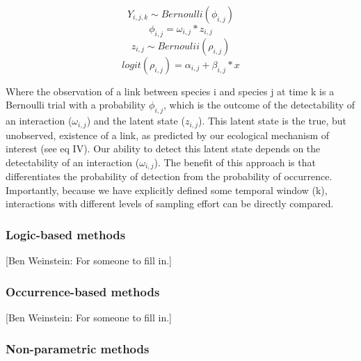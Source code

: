 \[ Y_{i,j,k} \sim Bernoulli(\phi_{i,j})\] \[ \phi_{i,j} = \omega_{i,j} *
z_{i,j}\] \[z_{i,j} \sim Bernoulii(\rho_{i,j})\] \[ logit(\rho_{i,j}) =
\alpha_{i,j} + \beta_{i,j} * x \]

Where the observation of a link between species i and species j at time k is a
Bernoulli trial with a probability \(\phi_{i,j}\), which is the outcome of the
detectability of an interaction (\(\omega_{i,j}\)) and the latent state
(\(z_{i,j}\)). This latent state is the true, but unobserved, existence of a
link, as predicted by our ecological mechanism of interest (see eq IV). Our
ability to detect this latent state depends on the detectability of an
interaction (\(\omega_{i,j}\)). The benefit of this approach is that
differentiates the probability of detection from the probability of occurrence.
Importantly, because we have explicitly defined some temporal window (k),
interactions with different levels of sampling effort can be directly compared.

\subsubsection{Logic-based methods}\label{logic-based-methods}

{[}Ben Weinstein: For someone to fill in.{]}

\subsubsection{Occurrence-based methods}\label{occurrence-based-methods}

{[}Ben Weinstein: For someone to fill in.{]}

\subsubsection{Non-parametric methods}\label{non-parametric-methods}

